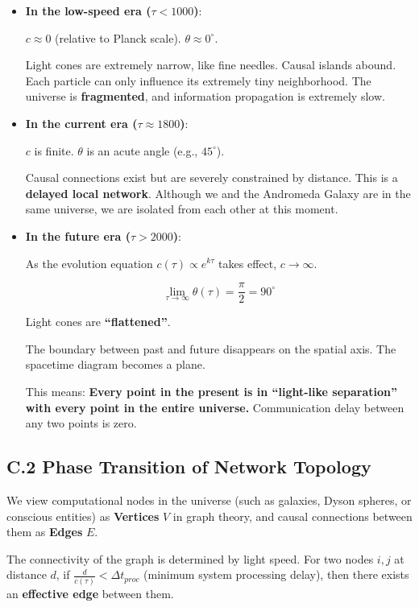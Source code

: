 \begin{itemize}
\item \textbf{In the low-speed era ($\tau < 1000$)}:

    $c \approx 0$ (relative to Planck scale). $\theta \approx 0^\circ$.

    Light cones are extremely narrow, like fine needles. Causal islands abound. Each particle can only influence its extremely tiny neighborhood. The universe is \textbf{fragmented}, and information propagation is extremely slow.

\item \textbf{In the current era ($\tau \approx 1800$)}:

    $c$ is finite. $\theta$ is an acute angle (e.g., $45^\circ$).

    Causal connections exist but are severely constrained by distance. This is a \textbf{delayed local network}. Although we and the Andromeda Galaxy are in the same universe, we are isolated from each other at this moment.

\item \textbf{In the future era ($\tau > 2000$)}:

    As the evolution equation $c(\tau) \propto e^{k\tau}$ takes effect, $c \to \infty$.

    \[\lim_{\tau \to \infty} \theta(\tau) = \frac{\pi}{2} = 90^\circ\]

    Light cones are \textbf{``flattened''}.

    The boundary between past and future disappears on the spatial axis. The spacetime diagram becomes a plane.

    This means: \textbf{Every point in the present is in ``light-like separation'' with every point in the entire universe.} Communication delay between any two points is zero.
\end{itemize}

\subsection{C.2 Phase Transition of Network Topology}

We view computational nodes in the universe (such as galaxies, Dyson spheres, or conscious entities) as \textbf{Vertices} $V$ in graph theory, and causal connections between them as \textbf{Edges} $E$.

The connectivity of the graph is determined by light speed. For two nodes $i, j$ at distance $d$, if $\frac{d}{c(\tau)} < \Delta t_{proc}$ (minimum system processing delay), then there exists an \textbf{effective edge} between them.

